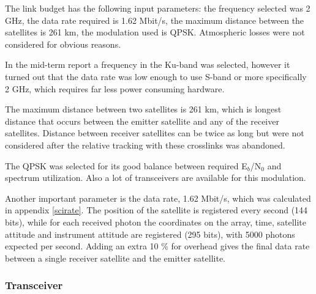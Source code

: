The link budget has the following input parameters: the frequency selected was 2 GHz, the data rate required is 1.62 Mbit/s, the maximum distance between the satellites is 261 km, the modulation used is \acs{QPSK}. Atmospheric losses were not considered for obvious reasons.

In the mid-term report a frequency in the Ku-band was selected, however it turned out that the data rate was low enough to use S-band or more specifically 2 GHz, which requires far less power consuming hardware.

The maximum distance between two satellites is 261 km, which is longest distance that occurs between the emitter satellite and any of the receiver satellites. Distance between receiver satellites can be twice as long but were not considered after the relative tracking with these crosslinks was abandoned.

The QPSK was selected for its good balance between required E$_{b}$/N$_{0}$ and spectrum utilization. Also a lot of transceivers are available for this modulation.

Another important parameter is the data rate, 1.62 Mbit/s, which was calculated in appendix \ref{scirate}. The position of the satellite is registered every second (144 bits), while for each received photon the coordinates on the array, time, satellite attitude and instrument attitude are registered (295 bits), with 5000 photons expected per second. Adding an extra 10 \% for overhead gives the final data rate between a single receiver satellite and the emitter satellite.

\subsubsection{Transceiver}


